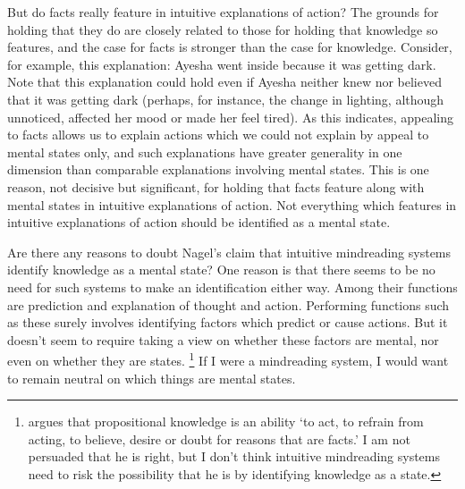 \documentclass[12pt,\papersize]{extarticle}
\begin{document}
But do facts really feature in intuitive explanations of action?
The grounds for holding that they do are closely related to those for holding that knowledge so features, and the case for facts is stronger than the case for knowledge.
Consider, for example, this explanation: Ayesha went inside because it was getting dark.
Note that this explanation could hold even if Ayesha neither knew nor believed that it was getting dark (perhaps, for instance, the change in lighting, although unnoticed, affected her mood or made her feel tired).
As this indicates, appealing to facts allows us to explain actions which we could not explain by appeal to mental states only, and such explanations have greater generality in one dimension than comparable explanations involving mental states.
This is one reason, not decisive but significant, for holding that facts feature along with mental states in intuitive explanations of action.
Not everything which features in intuitive explanations of action should be identified as a mental state.



Are there any reasons to doubt  Nagel's claim that intuitive mindreading systems identify knowledge as a mental state?
One reason is that there seems to be no need for such systems to make an identification either way.
Among their functions are prediction and explanation of thought and action.
Performing functions such as these surely involves identifying factors which predict or cause actions. 
But it doesn't seem to require taking a view on whether these factors are mental, nor even on whether they are states.%
\footnote{
\citet[p.\ 451]{Hyman:1999fk} argues that propositional knowledge is an ability `to act, to refrain from acting, to believe, desire or doubt for reasons that are facts.' 
I am not persuaded that he is right, but I don't think intuitive mindreading systems need to risk the possibility that he is by identifying knowledge as a state.
}
If I were a mindreading system, I would want to remain neutral on which things are mental states.
\end{document}
